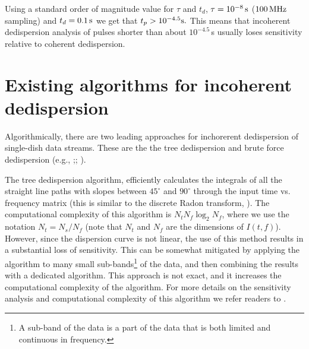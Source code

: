 \documentclass[iop]{emulateapj}
\begin{document}
Using a standard order of magnitude value for $\tau$ and $t_d$, $\tau = 10^{-8}\,{\rm s}$ ($100\,{\rm MHz}$ sampling) and $t_d = 0.1\,{\rm s}$ we get that $t_p > 10^{-4.5}{\rm s}.$
This means that incoherent dedispersion analysis of pulses shorter than about $10^{-4.5}\,$s usually loses sensitivity relative to coherent dedispersion. 

\section{Existing algorithms for incoherent dedispersion}\label{sec:ExistingMethods}
Algorithmically, there are two leading approaches for inchorerent dedispersion of single-dish data streams.
These are the the tree dedispersion \citep{TreeDedispersion} and brute force dedispersion (e.g., \citealp{GPUsub-bandDedispersion};\citealp{GPUDedispersion}; \citealp{FPGADedispersion}).

The tree dedispersion algorithm, efficiently calculates the integrals of all the straight line paths with slopes between $45^\circ$ and $90^\circ$ through the input time vs. frequency matrix (this is similar to the discrete Radon transform, \citealt{RadonGotsDruckmuller,RadonBrady}).
The computational complexity of this algorithm is $N_{t}N_{f}\log_2{N_{f}}$,
where we use the notation $N_{t} = N_s/N_{f}$ (note that $N_t$ and $N_f$ are the dimensions of $I(t,f)$).
However, since the dispersion curve is not linear, the use of this method
results in a substantial loss of sensitivity.
This can be somewhat mitigated by applying the algorithm to many small sub-bands\footnote{A sub-band of the data is a part of the data that is both limited and continuous in frequency.} of the data, and then combining the results with a dedicated algorithm. This approach is not exact, and it increases the computational complexity of the algorithm. For more details on the sensitivity analysis and computational complexity of this algorithm we refer readers to \citet{GPUDedispersion}.
\end{document}
